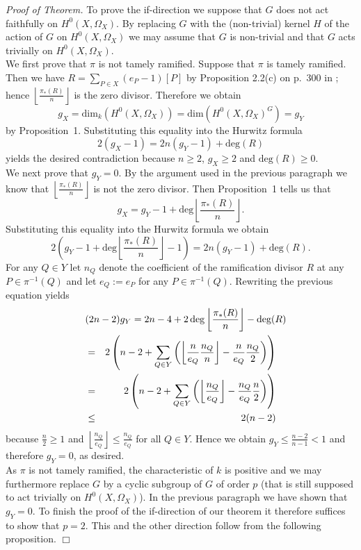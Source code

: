 \documentclass[12pt,leqno]{article}
\begin{document}
{\em Proof of Theorem.} To prove the if-direction we suppose
that $G$ does not act faithfully on $H^0(X, \Omega_X)$. By
replacing $G$ with the (non-trivial) kernel $H$ of the action
of $G$ on $H^0(X, \Omega_X)$ we may assume that $G$ is
non-trivial and that $G$ acts trivially on $H^0(X,\Omega_X)$.\\
We first prove that $\pi$ is not tamely ramified. Suppose that
$\pi$ is tamely ramified. Then we have $R= \sum_{P \in X}
(e_P-1)[P]$ by Proposition 2.2(c) on p.~300 in \cite{Ha}; hence
$\left \lfloor \frac{\pi_*(R)}{n} \right \rfloor$ is the zero
divisor. Therefore we obtain
\[g_X = \textrm{dim}_k\left(H^0(X, \Omega_X)\right) =
\textrm{dim}\left(H^0(X,\Omega_X)^G\right) = g_Y\] by
Proposition~1. Substituting this equality into the Hurwitz
formula
\[2(g_X -1) = 2n (g_Y-1) + \textrm{deg}(R)\]
yields the desired contradiction because $n \ge 2$, $g_X \ge 2$
and $\textrm{deg}(R) \ge 0$. \\
We next prove that $g_Y =0$. By the argument used in the
previous paragraph we know that $\left \lfloor
\frac{\pi_*(R)}{n} \right \rfloor$ is not the zero divisor.
Then Proposition~1 tells us that
\[g_X = g_Y-1 + \textrm{deg} \left \lfloor \frac{\pi_*(R)}{n}
\right \rfloor.\] Substituting this equality into the Hurwitz
formula we obtain
\[2\left(g_Y - 1 + \textrm{deg}\left \lfloor \frac{\pi_*(R)}{n}
\right \rfloor -1 \right) = 2n (g_Y -1) + \textrm{deg}(R).\]
For any $Q \in Y$ let $n_Q$ denote the coefficient of the
ramification divisor $R$ at any $P \in \pi^{-1}(Q)$ and let
$e_Q := e_P$ for any $P \in \pi^{-1}(Q)$. Rewriting the
previous equation yields
\begin{eqnarray*}
\lefteqn{(2n-2)g_Y = 2n-4 + 2 \,\textrm{deg}\left \lfloor
\frac{\pi_*(R)}{n}\right \rfloor - \textrm{deg}(R)}\\
&=& 2 \left(n-2 + \sum_{Q \in Y}
\left(\left\lfloor \frac{n}{e_Q} \frac{n_Q}{n} \right\rfloor - \frac{n}{e_Q} \frac{n_Q}{2}\right) \right)\\
&=& 2 \left(n-2 + \sum_{Q \in Y}
\left( \left\lfloor \frac{n_Q}{e_Q} \right\rfloor - \frac{n_Q}{e_Q} \frac{n}{2} \right)\right)\\
& \le & 2(n-2)
\end{eqnarray*}
because $\frac{n}{2} \ge 1$ and $\left\lfloor \frac{n_Q}{e_Q}
\right\rfloor \le \frac{n_Q}{e_Q}$ for all $Q \in Y$. Hence we
obtain $g_Y \le \frac{n-2}{n-1} < 1$ and therefore $g_Y =0$, as
desired. \\
As $\pi$ is not tamely ramified, the characteristic of $k$ is
positive and we may furthermore replace $G$ by a cyclic
subgroup of $G$ of order $p$ (that is still supposed to act
trivially on $H^0(X,\Omega_X)$). In the previous paragraph we
have shown that $g_Y=0$. To finish the proof of the
if-direction of our theorem it therefore suffices to show that
$p=2$.  This and the other direction follow from the following
proposition. \hfill $\Box$
\end{document}
